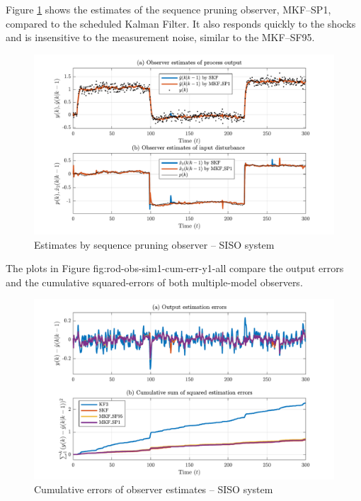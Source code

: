 Figure \ref{fig:rod-obs-sim1-yest-1-SP} shows the estimates of the sequence pruning observer, MKF--SP1, compared to the scheduled Kalman Filter.  It also responds quickly to the shocks and is insensitive to the measurement noise, similar to the MKF--SF95.
\begin{figure}[htp]
	\centering
	\includegraphics[width=13cm]{images/rod_obs_sim1_all_seed_y_est1_SP1.pdf}
	\caption{Estimates by sequence pruning observer – SISO system}
	\label{fig:rod-obs-sim1-yest-1-SP}
\end{figure}


The plots in Figure {fig:rod-obs-sim1-cum-err-y1-all} compare the output errors and the cumulative squared-errors of both multiple-model observers.
\begin{figure}[htp]
	\centering
	\includegraphics[width=13cm]{images/rod_obs_sim1_all_seed_cum_err_y1.pdf}
	\caption{Cumulative errors of observer estimates – SISO system}
	\label{fig:rod-obs-sim1-cum-err-y1-all}
\end{figure}

